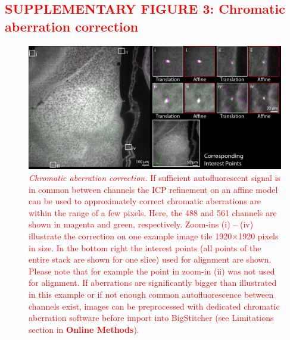 \documentclass[]{spie}  %
\def\red{\textcolor{red}}
\begin{document}
\pagebreak

\subsection*{\red{SUPPLEMENTARY FIGURE 3: Chromatic aberration correction}}
\vspace{1mm}
\begin{figure}[h!]
\includegraphics[width=\textwidth]{fig-chr_aberrations.jpg}
\vspace{-2.0mm}
\caption{\hspace{-0.5mm} \red{\emph{Chromatic aberration correction.} If sufficient autofluorescent signal is in common between channels the ICP refinement on an affine model can be used to approximately correct chromatic aberrations are within the range of a few pixels. Here, the 488 and 561 channels are shown in magenta and green, respectively. Zoom-ins (i) -- (iv) illustrate the correction on one example image tile 1920$\times$1920 pixels in size. In the bottom right the interest points (all points of the entire stack are shown for one slice) used for alignment are shown. Please note that for example the point in zoom-in (ii) was not used for alignment. If aberrations are significantly bigger than illustrated in this example or if not enough common autofluorescence between channels exist, images can be preprocessed with dedicated chromatic aberration software before import into BigStitcher (see Limitations section in \textbf{Online Methods}).
}}
\label{fig:sup-chromatic}
\end{figure}

\pagebreak
\end{document}
